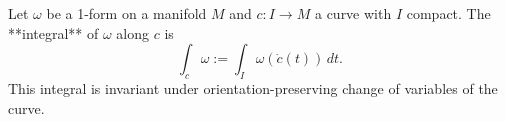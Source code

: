 Let $\omega$ be a 1-form on a manifold $M$ and $c: I \to M$ a curve with $I$ compact. The **integral** of $\omega$ along $c$ is
$$\int_c \omega := \int_I \omega(\dot{c}(t)) \, dt.$$
This integral is invariant under orientation-preserving change of variables of the curve.